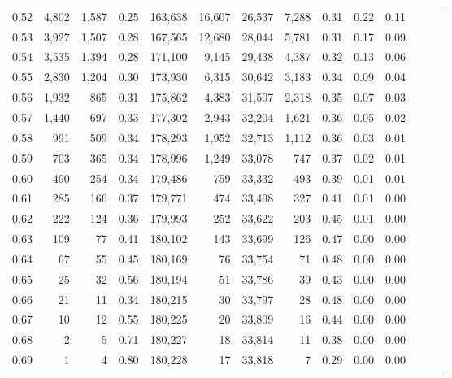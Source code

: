 \begin{tabular}{rrrrrrrrrrrrrr}
0.52 &   4,802 &  1,587 &  0.25 &  163,638 &   16,607 &  26,537 &   7,288 &  0.31 &  0.22 &      0.11 \\
0.53 &   3,927 &  1,507 &  0.28 &  167,565 &   12,680 &  28,044 &   5,781 &  0.31 &  0.17 &      0.09 \\
0.54 &   3,535 &  1,394 &  0.28 &  171,100 &    9,145 &  29,438 &   4,387 &  0.32 &  0.13 &      0.06 \\
0.55 &   2,830 &  1,204 &  0.30 &  173,930 &    6,315 &  30,642 &   3,183 &  0.34 &  0.09 &      0.04 \\
0.56 &   1,932 &    865 &  0.31 &  175,862 &    4,383 &  31,507 &   2,318 &  0.35 &  0.07 &      0.03 \\
0.57 &   1,440 &    697 &  0.33 &  177,302 &    2,943 &  32,204 &   1,621 &  0.36 &  0.05 &      0.02 \\
0.58 &     991 &    509 &  0.34 &  178,293 &    1,952 &  32,713 &   1,112 &  0.36 &  0.03 &      0.01 \\
0.59 &     703 &    365 &  0.34 &  178,996 &    1,249 &  33,078 &     747 &  0.37 &  0.02 &      0.01 \\
0.60 &     490 &    254 &  0.34 &  179,486 &      759 &  33,332 &     493 &  0.39 &  0.01 &      0.01 \\
0.61 &     285 &    166 &  0.37 &  179,771 &      474 &  33,498 &     327 &  0.41 &  0.01 &      0.00 \\
0.62 &     222 &    124 &  0.36 &  179,993 &      252 &  33,622 &     203 &  0.45 &  0.01 &      0.00 \\
0.63 &     109 &     77 &  0.41 &  180,102 &      143 &  33,699 &     126 &  0.47 &  0.00 &      0.00 \\
0.64 &      67 &     55 &  0.45 &  180,169 &       76 &  33,754 &      71 &  0.48 &  0.00 &      0.00 \\
0.65 &      25 &     32 &  0.56 &  180,194 &       51 &  33,786 &      39 &  0.43 &  0.00 &      0.00 \\
0.66 &      21 &     11 &  0.34 &  180,215 &       30 &  33,797 &      28 &  0.48 &  0.00 &      0.00 \\
0.67 &      10 &     12 &  0.55 &  180,225 &       20 &  33,809 &      16 &  0.44 &  0.00 &      0.00 \\
0.68 &       2 &      5 &  0.71 &  180,227 &       18 &  33,814 &      11 &  0.38 &  0.00 &      0.00 \\
0.69 &       1 &      4 &  0.80 &  180,228 &       17 &  33,818 &       7 &  0.29 &  0.00 &      0.00 \\

\end{tabular}
